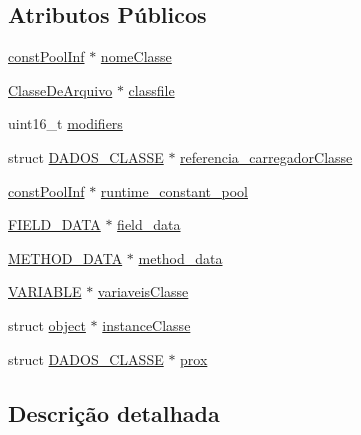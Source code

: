 \subsection*{Atributos Públicos}
\begin{DoxyCompactItemize}
\item 
\hyperlink{structconst_pool_inf}{const\-Pool\-Inf} $\ast$ \hyperlink{struct_d_a_d_o_s___c_l_a_s_s_e_aa36d42ba9b426675415d1da6c02e4420}{nome\-Classe}
\item 
\hyperlink{struct_classe_de_arquivo}{Classe\-De\-Arquivo} $\ast$ \hyperlink{struct_d_a_d_o_s___c_l_a_s_s_e_a04a5c6ada8a199cc0f66130e8f3fd0db}{classfile}
\item 
uint16\-\_\-t \hyperlink{struct_d_a_d_o_s___c_l_a_s_s_e_a49b8ef228c1e9116fa30acb28a3b6402}{modifiers}
\item 
struct \hyperlink{struct_d_a_d_o_s___c_l_a_s_s_e}{D\-A\-D\-O\-S\-\_\-\-C\-L\-A\-S\-S\-E} $\ast$ \hyperlink{struct_d_a_d_o_s___c_l_a_s_s_e_af50666164c0a79d63ff831010e8318c9}{referencia\-\_\-carregador\-Classe}
\item 
\hyperlink{structconst_pool_inf}{const\-Pool\-Inf} $\ast$ \hyperlink{struct_d_a_d_o_s___c_l_a_s_s_e_a0c018490460fc694fc1bcdeddbd49e02}{runtime\-\_\-constant\-\_\-pool}
\item 
\hyperlink{core_8h_ad5537b62ac62d6b7f34e2303f2b84982}{F\-I\-E\-L\-D\-\_\-\-D\-A\-T\-A} $\ast$ \hyperlink{struct_d_a_d_o_s___c_l_a_s_s_e_a6a524c5e2a3eda5b548ee3cf703c727d}{field\-\_\-data}
\item 
\hyperlink{core_8h_af2592f49e52b0675aaca5850571f3999}{M\-E\-T\-H\-O\-D\-\_\-\-D\-A\-T\-A} $\ast$ \hyperlink{struct_d_a_d_o_s___c_l_a_s_s_e_a75c522131e8a7325da50f22f8c373ffa}{method\-\_\-data}
\item 
\hyperlink{core_8h_a85b40991452ad00efae1784148c94402}{V\-A\-R\-I\-A\-B\-L\-E} $\ast$ \hyperlink{struct_d_a_d_o_s___c_l_a_s_s_e_a61814affa4242c9de4ab4380163ae315}{variaveis\-Classe}
\item 
struct \hyperlink{structobject}{object} $\ast$ \hyperlink{struct_d_a_d_o_s___c_l_a_s_s_e_a3e8be397f59bd8130a2d3df976af3830}{instance\-Classe}
\item 
struct \hyperlink{struct_d_a_d_o_s___c_l_a_s_s_e}{D\-A\-D\-O\-S\-\_\-\-C\-L\-A\-S\-S\-E} $\ast$ \hyperlink{struct_d_a_d_o_s___c_l_a_s_s_e_a5d3d779158876f9def507bdad79037be}{prox}
\end{DoxyCompactItemize}


\subsection{Descrição detalhada}


